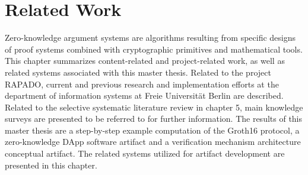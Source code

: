 \chapter{Related Work}
Zero-knowledge argument systems are algorithms resulting from specific designs of proof systems combined with cryptographic primitives and mathematical tools. This chapter summarizes content-related and project-related work, as well as related systems associated with this master thesis. Related to the project RAPADO, current and previous research and implementation efforts at the department of information systems at Freie Universit{\"a}t Berlin are described. Related to the selective systematic literature review in chapter 5, main knowledge surveys are presented to be referred to for further information. The results of this master thesis are a step-by-step example computation of the Groth16 protocol, a zero-knowledge DApp software artifact and a verification mechanism architecture conceptual artifact. The related systems utilized for artifact development are presented in this chapter.

